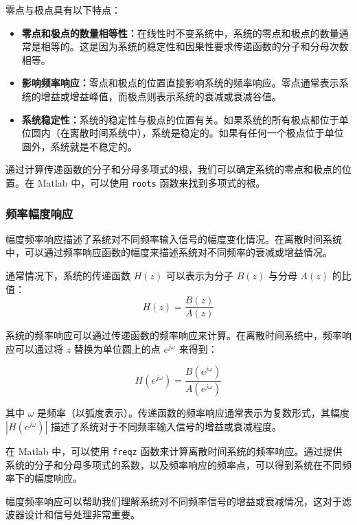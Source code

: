 \documentclass[a4paper,12pt]{article}
\begin{document}
零点与极点具有以下特点：

\begin{itemize}
    \item \textbf{零点和极点的数量相等性：}在线性时不变系统中，系统的零点和极点的数量通常是相等的。这是因为系统的稳定性和因果性要求传递函数的分子和分母次数相等。
    
    \item \textbf{影响频率响应：}零点和极点的位置直接影响系统的频率响应。零点通常表示系统的增益或增益峰值，而极点则表示系统的衰减或衰减谷值。
    
    \item \textbf{系统稳定性：}系统的稳定性与极点的位置有关。如果系统的所有极点都位于单位圆内（在离散时间系统中），系统是稳定的。如果有任何一个极点位于单位圆外，系统就是不稳定的。
\end{itemize}

通过计算传递函数的分子和分母多项式的根，我们可以确定系统的零点和极点的位置。在 Matlab 中，可以使用 \texttt{roots} 函数来找到多项式的根。

\subsubsection{频率幅度响应}
幅度频率响应描述了系统对不同频率输入信号的幅度变化情况。在离散时间系统中，可以通过频率响应函数的幅度来描述系统对不同频率的衰减或增益情况。

通常情况下，系统的传递函数 \( H(z) \) 可以表示为分子 \( B(z) \) 与分母 \( A(z) \) 的比值：
\begin{equation}
    H(z) = \frac{B(z)}{A(z)}
\end{equation}

系统的频率响应可以通过传递函数的频率响应来计算。在离散时间系统中，频率响应可以通过将 \( z \) 替换为单位圆上的点 \( e^{j\omega} \) 来得到：

\begin{equation}
    H(e^{j\omega}) = \frac{B(e^{j\omega})}{A(e^{j\omega})}
\end{equation}

其中 \( \omega \) 是频率（以弧度表示）。传递函数的频率响应通常表示为复数形式，其幅度 \( |H(e^{j\omega})| \) 描述了系统对于不同频率输入信号的增益或衰减程度。

在 Matlab 中，可以使用 \texttt{freqz} 函数来计算离散时间系统的频率响应。通过提供系统的分子和分母多项式的系数，以及频率响应的频率点，可以得到系统在不同频率下的幅度响应。

幅度频率响应可以帮助我们理解系统对不同频率信号的增益或衰减情况，这对于滤波器设计和信号处理非常重要。
\end{document}
